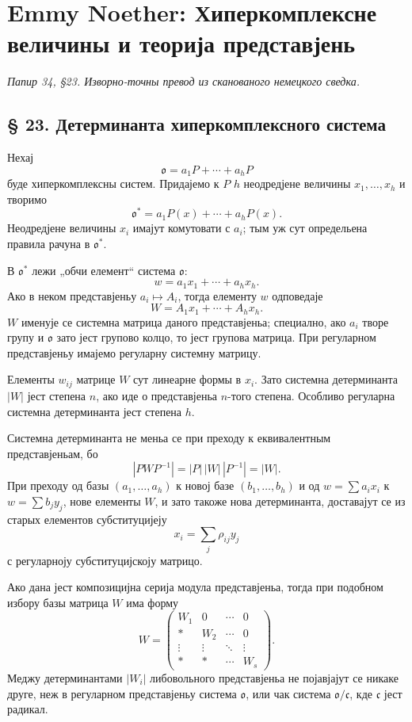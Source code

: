 ﻿\documentclass[11pt]{article}
\providecommand{\mo}{\mathfrak{o}}
\providecommand{\mc}{\mathfrak{c}}
\begin{document}
\section*{Emmy Noether: Хиперкомплексне величины и теорија представјень}
\emph{Папир 34, §23. Изворно-точны превод из сканованого немецкого сведка.}

\subsection*{§ 23. Детерминанта хиперкомплексного система}

Нехај
\[
        \mo=a_1P+\cdots+a_hP
\]
буде хиперкомплексны систем. Придајемо к $P$ $h$ неодредјене величины $x_1,\ldots,x_h$ и творимо
\[
        \mo^*=a_1P(x)+\cdots+a_hP(x).
\]
Неодредјене величины $x_i$ имајут комутовати с $a_i$; тым уж сут определьена правила рачуна в $\mo^*$.

В $\mo^*$ лежи „обчи елемент“ система $\mo$:
\[
        w=a_1x_1+\cdots+a_hx_h.
\]
Ако в неком представјеньу $a_i\mapsto A_i$, тогда елементу $w$ одповедаје
\[
        W=A_1x_1+\cdots+A_hx_h.
\]
$W$ именује се системна матрица даного представјеньа; специално, ако $a_i$ творе групу и $\mo$ зато јест групово колцо, то јест групова матрица. При регуларном представјеньу имајемо регуларну системну матрицу.

Елементы $w_{ij}$ матрице $W$ сут линеарне формы в $x_i$. Зато системна детерминанта $|W|$ јест степена $n$, ако иде о представјеньа $n$-того степена. Особливо регуларна системна детерминанта јест степена $h$.

Системна детерминанта не меньа се при преходу к еквивалентным представјеньам, бо
\[
        |PWP^{-1}|=|P|\,|W|\,|P^{-1}|=|W|.
\]
При преходу од базы $(a_1,\ldots,a_h)$ к новој базе $(b_1,\ldots,b_h)$ и од $w=\sum a_ix_i$ к $w=\sum b_jy_j$, нове елементы $W$, и зато такоже нова детерминанта, доставајут се из старых елементов субституцијеју
\[
        x_i=\sum_j\rho_{ij}y_j
\]
с регуларноју субституцијскоју матрицо.

Ако дана јест композицијна серија модула представјеньа, тогда при подобном избору базы матрица $W$ има форму
\[
        W=\begin{pmatrix}
        W_1&0&\cdots&0\\
        *&W_2&\cdots&0\\
        \vdots&\vdots&\ddots&\vdots\\
        *&*&\cdots&W_s
        \end{pmatrix}.
\]
Меджу детерминантами $|W_i|$ либовольного представјеньа не појавјајут се никаке друге, неж в регуларном представјеньу система $\mo$, или чак система $\mo/\mc$, кде $\mc$ јест радикал.
\end{document}
